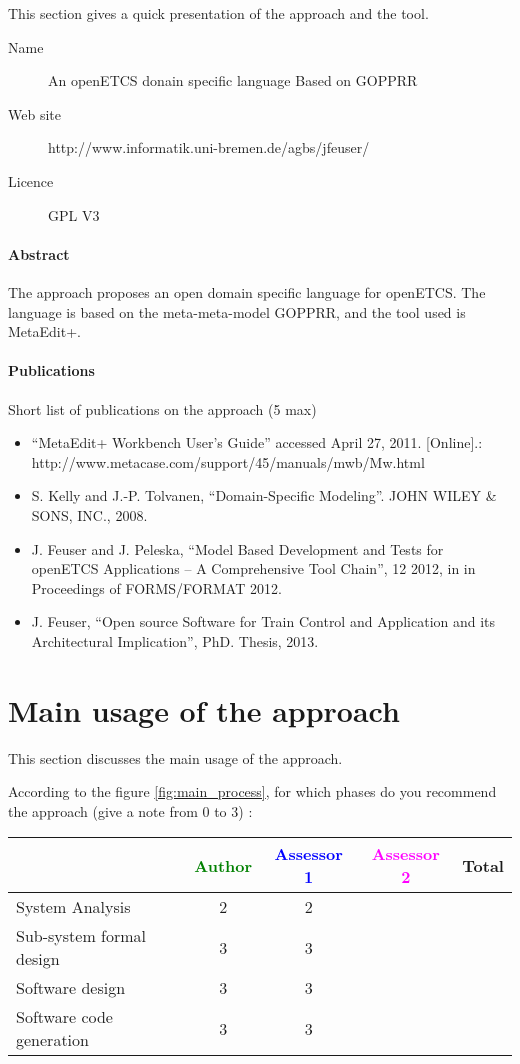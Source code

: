 This section gives a quick presentation of the approach and the tool.

\begin{description}
\item[Name] An openETCS donain specific language Based on GOPPRR
\item[Web site] http://www.informatik.uni-bremen.de/agbs/jfeuser/
\item[Licence] GPL V3
\end{description}

\paragraph{Abstract} 
The approach proposes an open  domain specific language for
openETCS. The language is based on the meta-meta-model  GOPPRR, and the
tool used is MetaEdit+.


\paragraph{Publications} Short list of publications on the approach (5 max)
\begin{itemize}
\item ``MetaEdit+ Workbench User’s Guide'' accessed April 27, 2011. [Online].:
http://www.metacase.com/support/45/manuals/mwb/Mw.html
\item S. Kelly and J.-P. Tolvanen, ``Domain-Specific Modeling''. JOHN WILEY \& SONS, INC.,
2008.
\item J. Feuser and J. Peleska, ``Model Based Development and Tests for openETCS Applications
– A Comprehensive Tool Chain'', 12 2012, in in Proceedings of FORMS/FORMAT 2012.
\item J. Feuser, ``Open source Software for Train Control and
  Application and its Architectural Implication'', PhD. Thesis, 2013.
\end{itemize}


\section{Main usage of the approach}
\label{main_usage}
This section discusses the main usage of the approach.

According to the figure \ref{fig:main_process}, for which phases do you recommend the approach (give a note from 0 to  3) :

\begin{tabular}{|l | c | c | c | c|}
\hline
& \textcolor{green}{Author} & \textcolor{blue}{Assessor 1} & \textcolor{magenta}{Assessor 2} & Total \\
\hline 
System Analysis &
2 &2 & &  \\
\hline
Sub-system formal design &3 &3 & & \\
\hline
Software design &3 &3 & & \\
\hline
Software code generation &3 &3 & & \\
\hline
\end{tabular}

